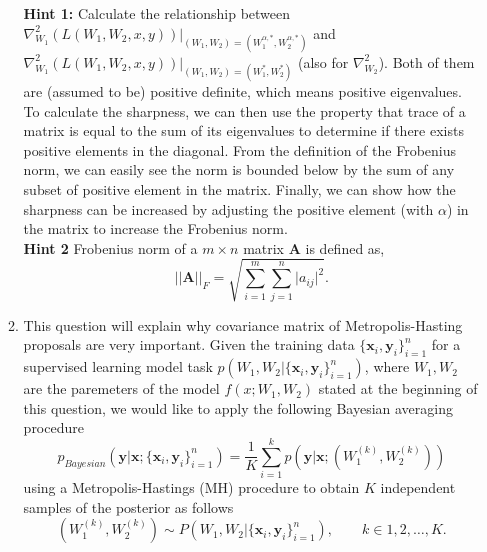 \begin{enumerate}
\begin{enumerate}
    
    \textbf{Hint 1:} Calculate the relationship between $\nabla^2_{W_1}(L(W_1,W_2,x,y))|_{(W_1,W_2) = (W^{\alpha,*}_1,W^{\alpha,*}_2)}$ and\\ $\nabla^2_{W_1}(L(W_1,W_2,x,y))|_{(W_1,W_2) = (W^{*}_1,W^{*}_2)}$ (also for $\nabla^2_{W_2}$). Both of them are (assumed to be) positive definite, which means positive eigenvalues. To calculate the sharpness, we can then use the property that trace of a matrix is equal to the sum of its eigenvalues to determine if there exists positive elements in the diagonal. From the definition of the Frobenius norm, we can easily see the norm is bounded below by the sum of any subset of positive element in the matrix. Finally, we can show how the sharpness can be increased by adjusting the positive element (with $\alpha$) in the matrix to increase the Frobenius norm. \\
    \textbf{Hint 2}
    {Frobenius norm of a $m \times n$ matrix $\mathbf{A}$ is defined as, 
        \begin{displaymath}
           \lvert\lvert\mathbf{A}\rvert\rvert_{F} = \sqrt{\sum_{i=1}^{m}\sum_{j=1}^{n}\lvert a_{ij}\rvert^2} .
        \end{displaymath}
        }

    

    \vspace{3in}
    

    \newpage
    \item This question will explain why covariance matrix of Metropolis-Hasting proposals are very important. Given the training data $\{\mathbf{x}_i, \mathbf{y}_i\}_{i=1}^{n}$ for a supervised learning model task $p(W_1, W_2| \{\mathbf{x}_i, \mathbf{y}_i\}_{i=1}^{n})$, where $W_1, W_2$ are the paremeters of the model $f(x;W_1,W_2)$ stated at the beginning of this question,  we would like to apply the following Bayesian averaging procedure $$p_{Bayesian}(\mathbf{y}|\mathbf{x}; \{\mathbf{x}_i, \mathbf{y}_i\}_{i=1}^{n}) = \frac{1}{K}\sum_{i=1}^{k}p(\mathbf{y}|\mathbf{x};(W^{(k)}_1,W^{(k)}_2))$$ using a Metropolis-Hastings (MH) procedure to obtain $K$ independent samples of the posterior as follows
    $$(W^{(k)}_1, W^{(k)}_2) \sim P(W_1, W_2 | \{\mathbf{x}_i, \mathbf{y}_i\}_{i=1}^{n} ), \qquad k \in{1, 2, \ldots, K}.$$ 
    

\end{enumerate}
\end{enumerate}

